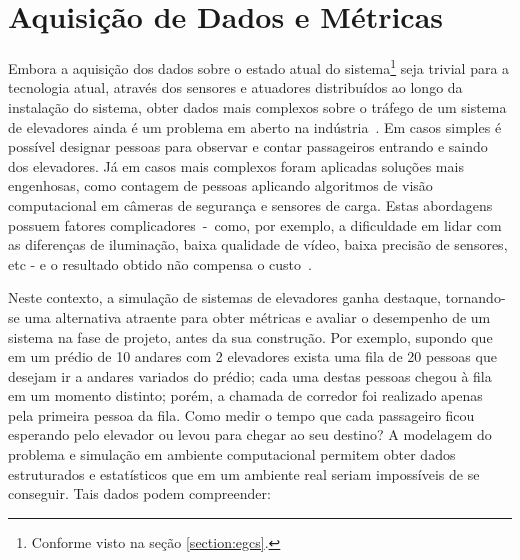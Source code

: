 \section{\label{section:data}Aquisição de Dados e Métricas}

Embora a aquisição dos dados sobre o estado atual do sistema\footnote{Conforme
visto na seção \ref{section:egcs}.} seja trivial para a tecnologia atual,
através dos sensores e atuadores distribuídos ao longo da instalação do sistema,
obter dados mais complexos sobre o tráfego de um sistema de elevadores ainda é
um problema em aberto na indústria~\cite{KOEHLEROTTIGER02}. Em casos simples é
possível designar pessoas para observar e contar passageiros entrando e saindo
dos elevadores. Já em casos mais complexos foram aplicadas soluções mais
engenhosas, como contagem de pessoas aplicando algoritmos de visão computacional
em câmeras de segurança e sensores de carga. Estas abordagens possuem fatores
complicadores~-~como, por exemplo, a dificuldade em lidar com as diferenças de
iluminação, baixa qualidade de vídeo, baixa precisão de sensores, etc - e o
resultado obtido não compensa o custo~\cite{KOEHLEROTTIGER02}.

Neste contexto, a simulação de sistemas de elevadores ganha destaque, tornando-
se uma alternativa atraente para obter métricas e avaliar o desempenho de um
sistema na fase de projeto, antes da sua construção. Por exemplo, supondo que em
um prédio de 10 andares com 2 elevadores exista uma fila de 20 pessoas que
desejam ir a andares variados do prédio; cada uma destas pessoas chegou à fila
em um momento distinto; porém, a chamada de corredor foi realizado apenas pela
primeira pessoa da fila. Como medir o tempo que cada passageiro ficou esperando
pelo elevador ou levou para chegar ao seu destino? A modelagem do problema e
simulação em ambiente computacional permitem obter dados estruturados e
estatísticos que em um ambiente real seriam impossíveis de se conseguir. Tais
dados podem compreender:

